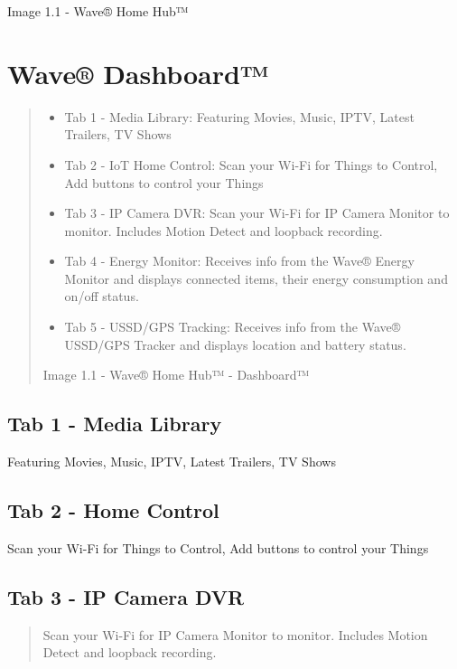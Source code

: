 \documentclass[letterpaper,10pt,english]{sphinxmanual}
\begin{document}
Image 1.1 - Wave® Home Hub™

\noindent{}


\section{Wave® Dashboard™}
\label{\detokenize{introduction:wave-dashboard}}\begin{quote}
\begin{itemize}
\item {} 
Tab 1 - Media Library: Featuring Movies, Music, IPTV, Latest Trailers, TV Shows

\item {} 
Tab 2 - IoT Home Control: Scan your Wi-Fi for Things to Control, Add buttons to control your Things

\item {} 
Tab 3 - IP Camera DVR: Scan your Wi-Fi for IP Camera Monitor to monitor. Includes Motion Detect and loopback recording.

\item {} 
Tab 4 - Energy Monitor: Receives info from the Wave® Energy Monitor and displays connected items, their energy consumption and on/off status.

\item {} 
Tab 5 - USSD/GPS Tracking: Receives info from the  Wave® USSD/GPS Tracker and displays location and battery status.

\end{itemize}

Image 1.1 - Wave® Home Hub™ - Dashboard™
\end{quote}

\noindent{}


\subsection{Tab 1 - Media Library}
\label{\detokenize{introduction:tab-1-media-library}}
Featuring Movies, Music, IPTV, Latest Trailers, TV Shows


\subsection{Tab 2 - Home Control}
\label{\detokenize{introduction:tab-2-home-control}}
Scan your Wi-Fi for Things to Control, Add buttons to control your Things


\subsection{Tab 3 - IP Camera DVR}
\label{\detokenize{introduction:tab-3-ip-camera-dvr}}\begin{quote}

Scan your Wi-Fi for IP Camera Monitor to monitor. Includes Motion Detect and loopback recording.
\end{quote}
\end{document}
